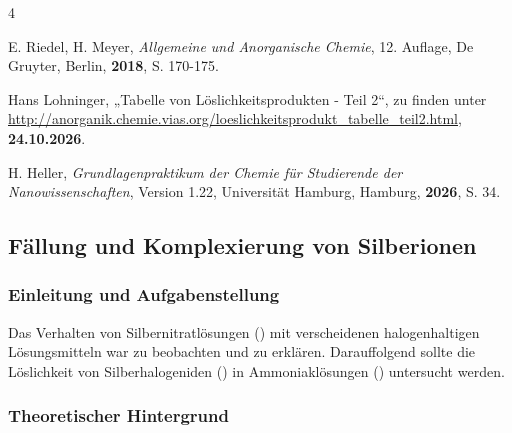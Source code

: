 \documentclass[
	a4paper,										%
	12pt,											%
	twoside,										%
	headsepline,								%
	footsepline,									%
	captions=tableheading,					%
]{scrartcl}
\begin{document}
\begin{thebibliography}{4}		%

						{E. Riedel, H. Meyer}, 
			\textit	{Allgemeine und Anorganische Chemie}, 
						{12. Auflage}, 
						{De Gruyter}, 
						{Berlin}, 
			\textbf	{2018}, 
			S.			{170-175}.

						{Hans Lohninger}, 
						„{Tabelle von Löslichkeitsprodukten - Teil 2}“, zu finden unter 
			\url		{http://anorganik.chemie.vias.org/loeslichkeitsprodukt_tabelle_teil2.html}, 
			\textbf	{24.10.2026}.

						{H. Heller}, 
			\textit	{Grundlagenpraktikum der Chemie für Studierende der Nanowissenschaften}, 
						{Version 1.22}, 
						{Universität Hamburg}, 
						{Hamburg}, 
			\textbf	{2026}, 
			S.			{34}.

			
\end{thebibliography}

\newpage

\setcounter{subsection}{1}							%
\setcounter{secnumdepth}{4}
	
\subsection{Fällung und Komplexierung von Silberionen}

\subsubsection{Einleitung und Aufgabenstellung}

	Das Verhalten von Silbernitratlösungen () mit verscheidenen halogenhaltigen Lösungsmitteln war zu beobachten und zu erklären.
	Darauffolgend sollte die Löslichkeit von Silberhalogeniden () in Ammoniaklösungen () untersucht werden.

\subsubsection{Theoretischer Hintergrund}
\end{document}
